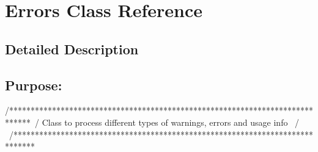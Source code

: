 \hypertarget{class_errors}{}\section{Errors Class Reference}
\label{class_errors}


\subsection{Detailed Description}
\subsection*{{\bfseries Purpose\+:} }

\begin{DoxyVerb}/*****************************************************************************\
/  Class to process different types of warnings, errors and usage info        \
/                                                                             \
/*****************************************************************************\
\end{DoxyVerb}


